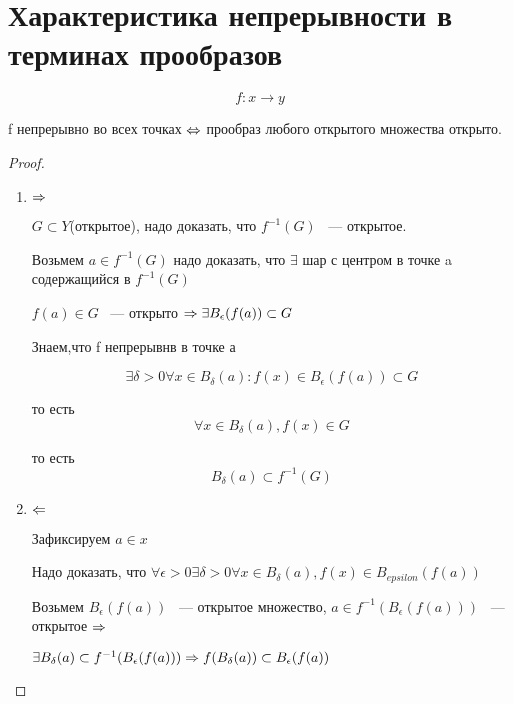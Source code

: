 ﻿\section{Характеристика непрерывности в терминах прообразов}

\begin{theorem}{}
$$f: x \to y$$

f непрерывно во всех точках $\Leftrightarrow$ прообраз любого открытого множества открыто.
\end{theorem}

\begin{proof}

\begin{enumerate}
\item $\Rightarrow$

$G \subset Y$(открытое), надо доказать, что  $f^{-1}(G)$ ~--- открытое.

Возьмем $a \in f^{-1}(G)$ надо доказать, что $\exists$ шар с центром в точке a содержащийся в $f^{-1}(G)$

$f(a) \in G$ ~--- открыто  $\Rightarrow \exists B_{\epsilon}(f(a)) \subset G$

Знаем,что f непрерывнв в точке а 

$$\exists \delta > 0  \forall x \in B_{\delta}(a): f(x) \in B_{\epsilon}(f(a)) \subset G$$

то есть  $$\forall x \in B_{\delta}(a), f(x) \in G $$

то есть $$B_{\delta}(a) \subset f^{-1}(G) $$

\item $\Leftarrow$

Зафиксируем $a \in x$

Надо доказать, что $\forall \epsilon > 0 \exists \delta > 0 \forall x \in B_{\delta}(a), f(x) \in B_{epsilon}(f(a))$

Возьмем $B_{\epsilon}(f(a))$ ~--- открытое множество,  $a \in f^{-1}(B_{\epsilon}(f(a)))$ ~--- открытое $\Rightarrow$ 

$\exists B_{\delta}(a) \subset f^{-1}(B_{\epsilon}(f(a))) \Rightarrow f(B_{\delta}(a)) \subset B_{\epsilon}(f(a))$

\end{enumerate}

\end{proof}
